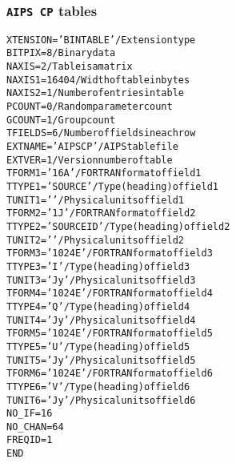 \documentclass[twoside]{article}
\begin{document}
\subsubsection{{\tt AIPS CP} tables}
\label{Appe:CPtable}
\begin{alltt}
XTENSION= 'BINTABLE'           / Extension type
BITPIX  =                    8 / Binary data
NAXIS   =                    2 / Table is a matrix
NAXIS1  =                16404 / Width of table in bytes
NAXIS2  =                    1 / Number of entries in table
PCOUNT  =                    0 / Random parameter count
GCOUNT  =                    1 / Group count
TFIELDS =                    6 / Number of fields in each row
EXTNAME = 'AIPS CP '           / AIPS table file
EXTVER  =                    1 / Version number of table
TFORM1  = '16A     '           / FORTRAN format of field  1
TTYPE1  = 'SOURCE          '   / Type (heading) of field  1
TUNIT1  = '        '           / Physical units of field  1
TFORM2  = '1J      '           / FORTRAN format of field  2
TTYPE2  = 'SOURCE ID       '   / Type (heading) of field  2
TUNIT2  = '        '           / Physical units of field  2
TFORM3  = '1024E   '           / FORTRAN format of field  3
TTYPE3  = 'I               '   / Type (heading) of field  3
TUNIT3  = 'Jy      '           / Physical units of field  3
TFORM4  = '1024E   '           / FORTRAN format of field  4
TTYPE4  = 'Q               '   / Type (heading) of field  4
TUNIT4  = 'Jy      '           / Physical units of field  4
TFORM5  = '1024E   '           / FORTRAN format of field  5
TTYPE5  = 'U               '   / Type (heading) of field  5
TUNIT5  = 'Jy      '           / Physical units of field  5
TFORM6  = '1024E   '           / FORTRAN format of field  6
TTYPE6  = 'V               '   / Type (heading) of field  6
TUNIT6  = 'Jy      '           / Physical units of field  6
NO_IF   =           16
NO_CHAN =           64
FREQID  =            1
END
\end{alltt}
\end{document}
